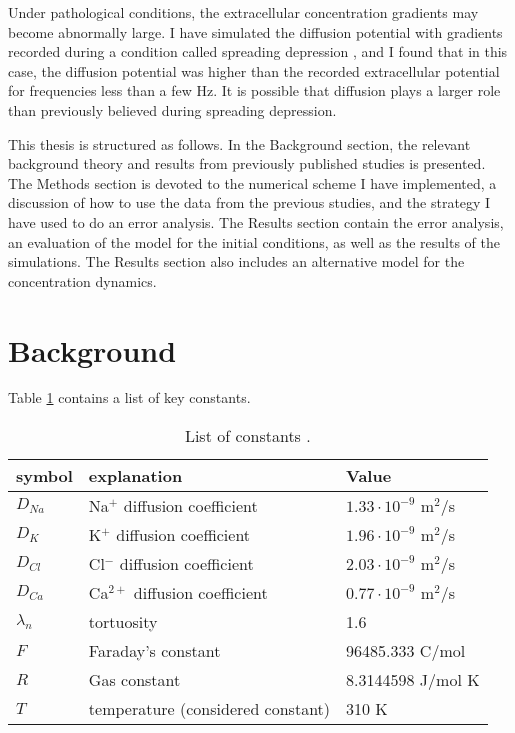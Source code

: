 \documentclass{article}
\begin{document}
Under pathological conditions, the extracellular concentration gradients may become abnormally large. I have simulated the diffusion potential with gradients recorded during a condition called spreading depression \cite{Herreras1993}\cite{Ataya2015}, and I found that in this case, the diffusion potential was higher than the recorded extracellular potential for frequencies less than a few Hz. It is possible that diffusion plays a larger role than previously believed during spreading depression.

This thesis is structured as follows. In the Background section, the relevant background theory and results from previously published studies is presented. The Methods section is devoted to the numerical scheme I have implemented, a discussion of how to use the data from the previous studies, and the strategy I have used to do an error analysis. The Results section contain the error analysis, an evaluation of the model for the initial conditions, as well as the results of the simulations. The Results section also includes an alternative model for the concentration dynamics. 



\section{Background}
Table \ref{tab:constants} contains a list of key constants.
\begin{table}[h!]
  \centering
  \caption{List of constants \cite{Halnes2016}.}
  \label{tab:constants}
  \begin{tabular}{l||l|l}
symbol & explanation & Value \\
\hline
$D_{Na}$  & Na$^+$ diffusion coefficient & $1.33\cdot 10^{-9}$ m$^2$/s  \\
$D_{K}$  & K$^+$ diffusion coefficient & $1.96\cdot 10^{-9}$ m$^2$/s   \\
$D_{Cl}$  & Cl$^-$ diffusion coefficient & $2.03\cdot 10^{-9}$ m$^2$/s   \\
$D_{Ca}$  & Ca$^{2+}$ diffusion coefficient & $0.77\cdot 10^{-9}$ m$^2$/s   \\
$\lambda_n$ & tortuosity & 1.6 \\
$F$ & Faraday's constant & 	96485.333 C/mol \\ 
$R$ & Gas constant & 8.3144598 J/mol K\\
$T$ & temperature (considered constant)& 310 K\\

 \end{tabular}
\end{table}
\end{document}
